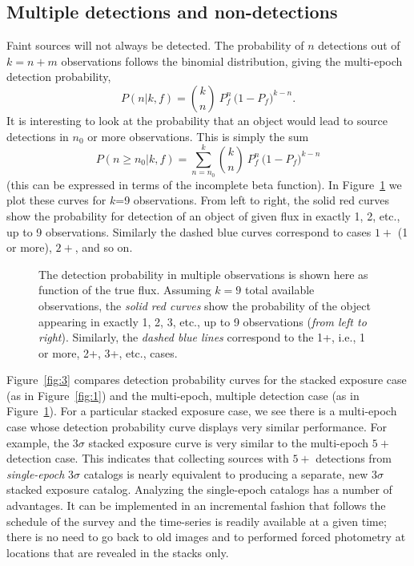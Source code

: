 \documentclass[twocolumn]{emulateapj}
\begin{document}
\subsection{Multiple detections and non-detections}
\noindent
%
Faint sources will not always be detected.
%
The probability of $n$ detections out of \mbox{$k=n+m$} observations follows the binomial distribution, giving the multi-epoch detection probability,
%
\begin{equation} \label{eq:binomial}
 P(n|k,f) = {k \choose n}\ P_f^n\,\big(1\!-\!P_f\big)^{k-n}.
\end{equation}
%
It is interesting to look at the probability that an object would lead to source detections in $n_0$ or more observations.
This is simply the sum
\begin{equation}
P(n\!\geq{}\!n_0|k,f) = \sum_{n=n_0}^k {k \choose n}\ P_f^n\,\big(1\!-\!P_f\big)^{k-n}
\end{equation}
%
(this can be expressed in terms of the incomplete beta function).
In Figure~\ref{fig:2} we plot these curves for \mbox{$k$=9} observations.
From left to right, the solid red curves show the probability for detection of an object of given flux in exactly 1, 2, etc., up to 9 observations.
Similarly the dashed blue curves correspond to cases $1+$ (1 or more), $2+$, and so on.

\begin{figure}
\caption{The detection probability in multiple observations is shown here as function of the true flux. Assuming \mbox{$k\!=\!9$} total available observations, the {\it{}solid red curves} show the probability of the object appearing in exactly 1, 2, 3, etc., up to 9 observations ({\it{}from left to right}). Similarly, the {\it{}dashed blue lines} correspond to the 1+, i.e., 1 or more, 2+, 3+, etc., cases.}
\label{fig:2}
\end{figure}


Figure~\ref{fig:3} compares detection probability curves for the stacked exposure case (as in Figure~\ref{fig:1}) and the multi-epoch, multiple detection case (as in Figure~\ref{fig:2}).
For a particular stacked exposure case, we see there is a multi-epoch case whose detection probability curve displays very similar performance.
For example, the $3\sigma$ stacked exposure curve is very similar to the multi-epoch $5+$ detection case.
This indicates that collecting sources with $5+$ detections from \emph{single-epoch} $3\sigma$ catalogs is nearly equivalent to producing a separate, new $3\sigma$ stacked exposure catalog.
%
Analyzing the single-epoch catalogs has a number of advantages.
It can be implemented in an incremental fashion that follows the schedule of the survey and the time-series is readily available at a given time; there is no need to go back to old images and to performed forced photometry at locations that are revealed in the stacks only.
\end{document}
